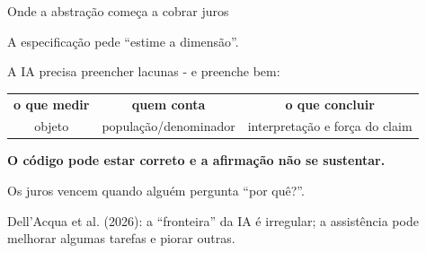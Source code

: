\documentclass[
  12pt,
  ignorenonframetext,
  aspectratio=169]{beamer}
\begin{document}
\begin{frame}{Onde a abstração começa a cobrar juros}
\protect{}\label{onde-a-abstrauxe7uxe3o-comeuxe7a-a-cobrar-juros}
\begin{center}
\vspace{0.35cm}
\Large A especificação pede “estime a dimensão”.

\vspace{0.4cm}
\large A IA precisa preencher lacunas - e preenche bem:

\vspace{0.35cm}
\begin{tabular}{c@{\quad}c@{\quad}c}
  \textbf{o que medir} & \textbf{quem conta} & {\color{orange}\textbf{o que concluir}} \\
  \small objeto & \small população/denominador & {\color{orange}\small interpretação e força do claim}
\end{tabular}

\vspace{0.55cm}
\textbf{O código pode estar correto e a afirmação não se sustentar.}

\vspace{0.3cm}
\normalsize Os juros vencem quando alguém pergunta “por quê?”.
\end{center}

\vfill{\tiny\color{muted}Dell’Acqua et al. (2026): a “fronteira” da IA é irregular; a assistência pode melhorar algumas tarefas e piorar outras.}
\end{frame}
\end{document}
